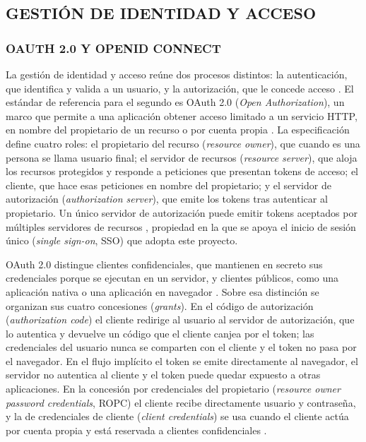 \subsection{GESTIÓN DE IDENTIDAD Y ACCESO}
\subsubsection{OAUTH 2.0 Y OPENID CONNECT}

La gestión de identidad y acceso reúne dos procesos distintos: la autenticación, que identifica y valida a un usuario, y la autorización, que le concede acceso \parencite{KeycloakServerAdmin}. El estándar de referencia para el segundo es OAuth 2.0 (\textit{Open Authorization}), un marco que permite a una aplicación obtener acceso limitado a un servicio HTTP, en nombre del propietario de un recurso o por cuenta propia \parencite{RFC6749}. La especificación define cuatro roles: el propietario del recurso (\textit{resource owner}), que cuando es una persona se llama usuario final; el servidor de recursos (\textit{resource server}), que aloja los recursos protegidos y responde a peticiones que presentan tokens de acceso; el cliente, que hace esas peticiones en nombre del propietario; y el servidor de autorización (\textit{authorization server}), que emite los tokens tras autenticar al propietario. Un único servidor de autorización puede emitir tokens aceptados por múltiples servidores de recursos \parencite{RFC6749}, propiedad en la que se apoya el inicio de sesión único (\textit{single sign-on}, SSO) que adopta este proyecto.

OAuth 2.0 distingue clientes confidenciales, que mantienen en secreto sus credenciales porque se ejecutan en un servidor, y clientes públicos, como una aplicación nativa o una aplicación en navegador \parencite{RFC6749}. Sobre esa distinción se organizan sus cuatro concesiones (\textit{grants}). En el código de autorización (\textit{authorization code}) el cliente redirige al usuario al servidor de autorización, que lo autentica y devuelve un código que el cliente canjea por el token; las credenciales del usuario nunca se comparten con el cliente y el token no pasa por el navegador. En el flujo implícito el token se emite directamente al navegador, el servidor no autentica al cliente y el token puede quedar expuesto a otras aplicaciones. En la concesión por credenciales del propietario (\textit{resource owner password credentials}, ROPC) el cliente recibe directamente usuario y contraseña, y la de credenciales de cliente (\textit{client credentials}) se usa cuando el cliente actúa por cuenta propia y está reservada a clientes confidenciales \parencite{RFC6749}.

